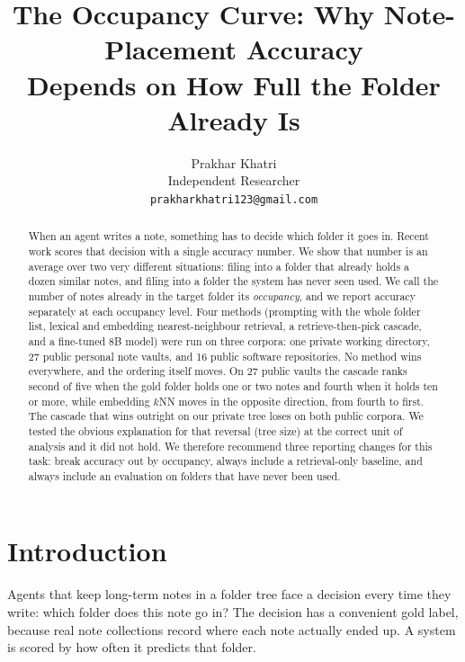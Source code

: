 \documentclass[11pt]{article}
\title{The Occupancy Curve: Why Note-Placement Accuracy\\
Depends on How Full the Folder Already Is}
\author{Prakhar Khatri \\ Independent Researcher \\ \texttt{prakharkhatri123@gmail.com}}
\begin{document}
\maketitle

\begin{abstract}
When an agent writes a note, something has to decide which folder it goes in.
Recent work scores that decision with a single accuracy number.
We show that number is an average over two very different situations: filing into a folder that already holds a dozen similar notes, and filing into a folder the system has never seen used.
We call the number of notes already in the target folder its \emph{occupancy}, and we report accuracy separately at each occupancy level.
Four methods (prompting with the whole folder list, lexical and embedding nearest-neighbour retrieval, a retrieve-then-pick cascade, and a fine-tuned 8B model) were run on three corpora: one private working directory, 27 public personal note vaults, and 16 public software repositories.
No method wins everywhere, and the ordering itself moves.
On 27 public vaults the cascade ranks second of five when the gold folder holds one or two notes and fourth when it holds ten or more, while embedding $k$NN moves in the opposite direction, from fourth to first.
The cascade that wins outright on our private tree loses on both public corpora.
We tested the obvious explanation for that reversal (tree size) at the correct unit of analysis and it did not hold.
We therefore recommend three reporting changes for this task: break accuracy out by occupancy, always include a retrieval-only baseline, and always include an evaluation on folders that have never been used.
\end{abstract}

\section{Introduction}

Agents that keep long-term notes in a folder tree face a decision every time they write: which folder does this note go in?
The decision has a convenient gold label, because real note collections record where each note actually ended up.
A system is scored by how often it predicts that folder.
\end{document}
